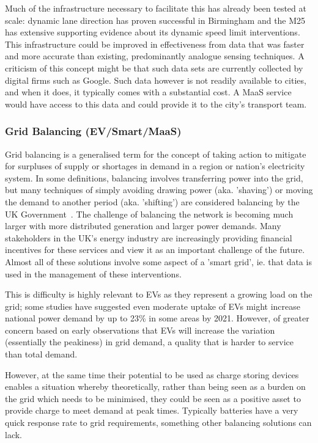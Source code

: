 \documentclass[journal]{IEEEtran}
\begin{document}
Much of the infrastructure necessary to facilitate this has already
been tested at scale: dynamic lane direction has proven successful in
Birmingham and the M25 has extensive supporting evidence about its
dynamic speed limit interventions. This infrastructure could be
improved in effectiveness from data that was faster and more accurate
than existing, predominantly analogue sensing techniques.  A criticism
of this concept might be that such data sets are currently collected
by digital firms such as Google. Such data however is not readily
available to cities, and when it does, it typically comes with a
substantial cost. A MaaS service would have access to this data
and could provide it to the city's transport team.


\subsubsection{Grid Balancing (EV/Smart/MaaS)} 

Grid balancing is a generalised term for the concept of taking action
to mitigate for surpluses of supply or shortages in demand in a region or nation’s
electricity system. In some definitions, balancing involves
transferring power into the grid, but many techniques of simply
avoiding drawing power (aka. 'shaving') or moving the demand to another period (aka. 'shifting') are considered balancing by
the UK Government~\cite{decc:2014}. The challenge of balancing the
network is becoming much larger with more distributed generation and
larger power demands. Many stakeholders in the UK's energy industry
are increasingly providing financial incentives for these services and
view it as an important challenge of the future. Almost all of these solutions involve some aspect of a 'smart grid', ie. that data is used in the management of these interventions. 

This is difficulty is highly relevant to EVs as they represent a growing load
on the grid; some studies have suggested even moderate uptake of EVs
might increase national power demand by up to 23\% in some areas by
2021. However, of greater concern based on early observations that EVs will increase the
variation (essentially the peakiness) in grid demand, a quality that
is harder to service than total demand.

However, at the same time their potential to be used as charge storing devices enables a
situation whereby theoretically, rather than being seen as a burden on the grid which needs
to be minimised, they could be seen as a positive asset to provide charge to
meet demand at peak times. Typically batteries have a very quick
response rate to grid requirements, something other balancing
solutions can lack. 
\end{document}
